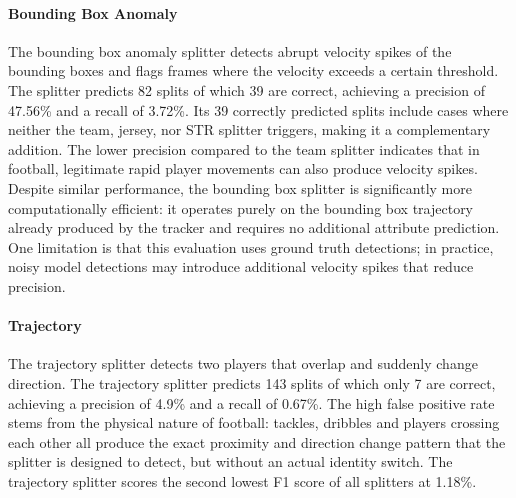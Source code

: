 \paragraph{Bounding Box Anomaly}
The bounding box anomaly splitter detects abrupt velocity spikes of the bounding boxes and flags frames where the velocity exceeds a certain threshold. The splitter predicts 82 splits of which 39 are correct, achieving a precision of 47.56\% and a recall of 3.72\%. Its 39 correctly predicted splits include cases where neither the team, jersey, nor STR splitter triggers, making it a complementary addition. The lower precision compared to the team splitter indicates that in football, legitimate rapid player movements can also produce velocity spikes. Despite similar performance, the bounding box splitter is significantly more computationally efficient: it operates purely on the bounding box trajectory already produced by the tracker and requires no additional attribute prediction. One limitation is that this evaluation uses ground truth detections; in practice, noisy model detections may introduce additional velocity spikes that reduce precision.


\paragraph{Trajectory}
The trajectory splitter detects two players that overlap and suddenly change direction. The trajectory splitter predicts 143 splits of which only 7 are correct, achieving a precision of 4.9\% and a recall of 0.67\%. The high false positive rate stems from the physical nature of football: tackles, dribbles and players crossing each other all produce the exact proximity and direction change pattern that the splitter is designed to detect, but without an actual identity switch. The trajectory splitter scores the second lowest F1 score of all splitters at 1.18\%.



